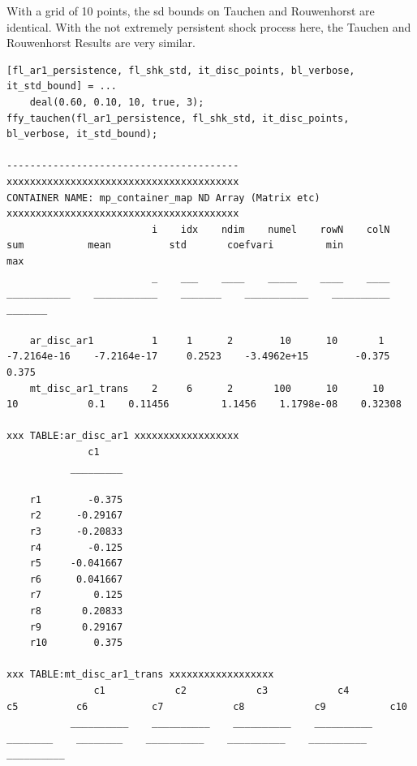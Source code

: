\documentclass[
]{book}
\begin{document}
With a grid of 10 points, the sd bounds on Tauchen and Rouwenhorst are
identical. With the not extremely persistent shock process here, the
Tauchen and Rouwenhorst Results are very similar.

\begin{verbatim}
[fl_ar1_persistence, fl_shk_std, it_disc_points, bl_verbose, it_std_bound] = ...
    deal(0.60, 0.10, 10, true, 3);
ffy_tauchen(fl_ar1_persistence, fl_shk_std, it_disc_points, bl_verbose, it_std_bound);

----------------------------------------
xxxxxxxxxxxxxxxxxxxxxxxxxxxxxxxxxxxxxxxx
CONTAINER NAME: mp_container_map ND Array (Matrix etc)
xxxxxxxxxxxxxxxxxxxxxxxxxxxxxxxxxxxxxxxx
                         i    idx    ndim    numel    rowN    colN        sum           mean          std       coefvari         min          max  
                         _    ___    ____    _____    ____    ____    ___________    ___________    _______    ___________    __________    _______

    ar_disc_ar1          1     1      2        10      10       1     -7.2164e-16    -7.2164e-17     0.2523    -3.4962e+15        -0.375      0.375
    mt_disc_ar1_trans    2     6      2       100      10      10              10            0.1    0.11456         1.1456    1.1798e-08    0.32308

xxx TABLE:ar_disc_ar1 xxxxxxxxxxxxxxxxxx
              c1    
           _________

    r1        -0.375
    r2      -0.29167
    r3      -0.20833
    r4        -0.125
    r5     -0.041667
    r6      0.041667
    r7         0.125
    r8       0.20833
    r9       0.29167
    r10        0.375

xxx TABLE:mt_disc_ar1_trans xxxxxxxxxxxxxxxxxx
               c1            c2            c3            c4           c5          c6           c7            c8            c9           c10    
           __________    __________    __________    __________    ________    ________    __________    __________    __________    __________


\end{verbatim}
\end{document}

